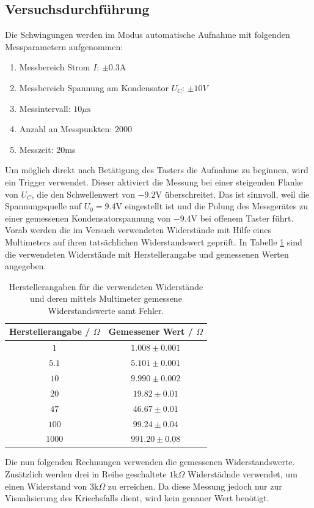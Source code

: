 \documentclass[a4paper, 12pt]{scrartcl}
\begin{document}
\subsection{Versuchsdurchführung}

Die Schwingungen werden im Modus \glqq automatische Aufnahme\grqq{} mit folgenden Messparametern aufgenommen:
\begin{enumerate}[-]
\item Messbereich Strom $I$: $\pm 0.3$A
\item Messbereich Spannung am Kondensator $U_C$: $\pm 10V$
\item Messintervall: $10\mu\text{s}$
\item Anzahl an Messpunkten: $2000$
\item Messzeit: $20$ms
\end{enumerate}
Um möglich direkt nach Betätigung des Tasters die Aufnahme zu beginnen, wird ein Trigger verwendet. Dieser aktiviert die Messung bei einer steigenden Flanke von $U_C$, die den Schwellenwert von $-9.2$V überschreitet. Das ist sinnvoll, weil die Spannungsquelle auf $U_0 = 9.4$V eingestellt ist und die Polung des Messgerätes zu einer gemessenen Kondensatorspannung von $-9.4$V bei offenem Taster führt. 
Vorab werden die im Versuch verwendeten Widerstände mit Hilfe eines Multimeters auf ihren tatsächlichen Widerstandswert geprüft. In Tabelle \ref{tab:widerstaende} sind die verwendeten Widerstände mit Herstellerangabe und gemessenen Werten angegeben.

\begin{table}[H]
\centering
\begin{tabular}{c|c}
Herstellerangabe / $\Omega$ & Gemessener Wert / $\Omega$ \\
\hline
$1$ & $1.008 \pm 0.001$ \\
$5.1$ & $5.101 \pm 0.001$ \\
$10$ & $9.990 \pm 0.002$ \\
$20$ & $19.82 \pm 0.01$ \\
$47$ & $46.67 \pm 0.01$ \\
$100$ & $99.24 \pm 0.04$ \\
$1000$ & $991.20\pm 0.08$
\end{tabular}
\caption{Herstellerangaben für die verwendeten Widerstände und deren mittels Multimeter gemessene Widerstandswerte samt Fehler.}
\label{tab:widerstaende}
\end{table}
Die nun folgenden Rechnungen verwenden die gemessenen Widerstandswerte. Zusätzlich werden drei in Reihe geschaltete $1\text{k}\Omega$ Widerstädnde verwendet, um einen Widerstand von $3\text{k}\Omega$ zu erreichen. Da diese Messung jedoch nur zur Visualisierung des Kriechsfalls dient, wird kein genauer Wert benötigt. 
\end{document}
